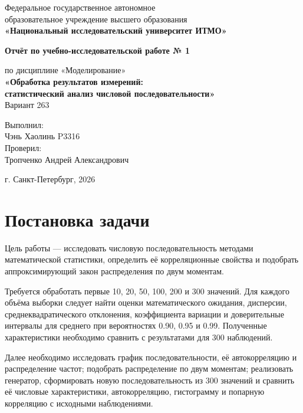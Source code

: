\documentclass[11pt,a4paper]{article}
\begin{document}
\hypersetup{pageanchor=false}
\begin{titlepage}
\centering
Федеральное государственное автономное\\
образовательное учреждение высшего образования\\
\textbf{«Национальный исследовательский университет ИТМО»}
\vfill
{\Large\bfseries Отчёт по учебно-исследовательской работе № 1\par}
\vspace{0.5\baselineskip}
по дисциплине «Моделирование»\\
\vspace{0.5\baselineskip}
\textbf{«Обработка результатов измерений:\\статистический анализ числовой последовательности»}\\
\vspace{0.5\baselineskip}
Вариант 263
\vfill
\begin{flushright}
Выполнил:\\
Чэнь Хаолинь P3316\\[1\baselineskip]
Проверил:\\
Тропченко Андрей Александрович
\end{flushright}
\vfill
\begin{center}г. Санкт-Петербург, 2026\end{center}
\end{titlepage}
\hypersetup{pageanchor=true}
\tableofcontents
\newpage
{}

\section{Постановка задачи}
Цель работы --- исследовать числовую последовательность методами математической статистики, определить её корреляционные свойства и подобрать аппроксимирующий закон распределения по двум моментам.

Требуется обработать первые 10, 20, 50, 100, 200 и 300 значений. Для каждого объёма выборки следует найти оценки математического ожидания, дисперсии, среднеквадратического отклонения, коэффициента вариации и доверительные интервалы для среднего при вероятностях 0.90, 0.95 и 0.99. Полученные характеристики необходимо сравнить с результатами для 300 наблюдений.

Далее необходимо исследовать график последовательности, её автокорреляцию и распределение частот; подобрать распределение по двум моментам; реализовать генератор, сформировать новую последовательность из 300 значений и сравнить её числовые характеристики, автокорреляцию, гистограмму и попарную корреляцию с исходными наблюдениями.
\end{document}
